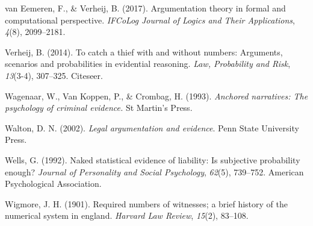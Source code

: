 \documentclass[11pt,dvipsnames,enabledeprecatedfontcommands]{scrartcl}
\begin{document}
\hypertarget{ref-vanEemeren2017}{}
van Eemeren, F., \& Verheij, B. (2017). Argumentation theory in formal
and computational perspective. \emph{IFCoLog Journal of Logics and Their
Applications}, \emph{4}(8), 2099--2181.

\hypertarget{ref-verheij2014catch}{}
Verheij, B. (2014). To catch a thief with and without numbers:
Arguments, scenarios and probabilities in evidential reasoning.
\emph{Law, Probability and Risk}, \emph{13}(3-4), 307--325. Citeseer.

\hypertarget{ref-wagenaar1993anchored}{}
Wagenaar, W., Van Koppen, P., \& Crombag, H. (1993). \emph{Anchored
narratives: The psychology of criminal evidence.} St Martin's Press.

\hypertarget{ref-Walton2002}{}
Walton, D. N. (2002). \emph{Legal argumentation and evidence}. Penn
State University Press.

\hypertarget{ref-wells1992naked}{}
Wells, G. (1992). Naked statistical evidence of liability: Is subjective
probability enough? \emph{Journal of Personality and Social Psychology},
\emph{62}(5), 739--752. American Psychological Association.

\hypertarget{ref-wigmore1901number}{}
Wigmore, J. H. (1901). Required numbers of witnesses; a brief history of
the numerical system in england. \emph{Harvard Law Review},
\emph{15}(2), 83--108.
\end{document}
